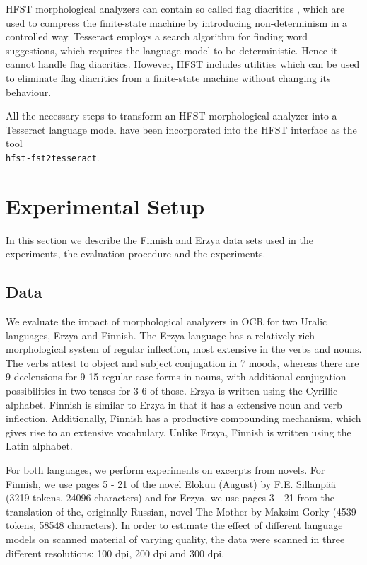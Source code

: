 \documentclass[b5paper]{article}
\begin{document}
HFST morphological analyzers can contain so called flag diacritics
\cite{beesley03}, which are used to compress the finite-state machine
by introducing non-determinism in a controlled way. Tesseract employs
a search algorithm for finding word suggestions, which requires
the language model to be deterministic. Hence it cannot handle flag
diacritics. However, HFST includes utilities which can be used to
eliminate flag diacritics from a finite-state machine without
changing its behaviour.

All the necessary steps to transform an HFST morphological analyzer
into a Tesseract language model have been incorporated into the HFST
interface as the tool\\{\tt hfst-fst2tesseract}.

\section{Experimental Setup}
\label{exp}

In this section we describe the Finnish and Erzya data sets used in
the experiments, the evaluation procedure and the experiments.

\subsection{Data}
We evaluate the impact of morphological analyzers in OCR for two
Uralic languages, Erzya and Finnish. 
The Erzya language has a relatively rich morphological system of
regular inflection, most extensive in the verbs and nouns. The verbs
attest to object and subject conjugation in 7 moods, whereas there are
9 declensions for 9-15 regular case forms in nouns, with additional
conjugation possibilities in two tenses for 3-6 of those. Erzya is
written using the Cyrillic alphabet.
Finnish is similar to Erzya in that it has a extensive noun and verb
inflection. Additionally, Finnish has a productive compounding
mechanism, which gives rise to an extensive vocabulary. Unlike Erzya,
Finnish is written using the Latin alphabet.

For both languages, we perform experiments on excerpts from novels.
For Finnish, we use pages 5 - 21 of the novel Elokuu (August) by
F.E. Sillanp\"{a}\"{a} \cite{sillanpaa08} (3219 tokens, 24096
characters) and for Erzya, we use pages 3 - 21 from the translation of
the, originally Russian, novel The Mother by Maksim Gorky \cite{gorki}
(4539 tokens, 58548 characters). In order to estimate the effect of
different language models on scanned material of varying quality, the
data were scanned in three different resolutions: 100 dpi, 200 dpi and
300 dpi.
\end{document}
